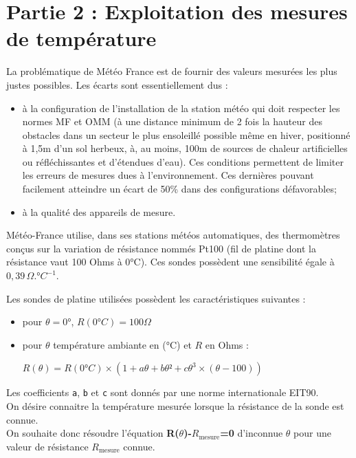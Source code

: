 \documentclass[10pt,fleqn]{article} %
\begin{document}
\section*{Partie 2 : Exploitation des mesures de température}
La problématique de Météo France est de fournir des valeurs mesurées les plus justes possibles. Les écarts sont essentiellement dus :
\begin{itemize}
	\item à la configuration de l'installation de la station météo qui doit respecter les normes MF et OMM (à une distance minimum de 2 fois la hauteur des obstacles dans un secteur le plus ensoleillé possible même en hiver, positionné à 1,5m d'un sol herbeux, à, au moins, 100m de sources de chaleur artificielles ou réfléchissantes et d'étendues d'eau). Ces conditions permettent de limiter les erreurs de mesures dues à l'environnement. Ces dernières pouvant facilement atteindre un écart de 50\% dans des configurations défavorables;
	\item à la qualité des appareils de mesure.
\end{itemize}

\vspace{0.5cm}
Météo-France utilise, dans ses stations météos automatiques, des thermomètres conçus sur la variation de résistance nommés Pt100 (fil de platine dont la résistance vaut 100 Ohms à 0°C). Ces sondes possèdent une sensibilité égale à $0,39\, \Omega.°C^{-1}$.

\vspace{0.5cm}
Les sondes de platine utilisées possèdent les caractéristiques suivantes :
\begin{itemize}
	\item pour $\theta=0°$, $R(0°C)=100\Omega$
	\item pour $\theta$ température ambiante en (°C) et $R$ en Ohms :
	
	\begin{center}
	$R(\theta)=R(0°C)\times(1+a\theta+b{\theta}²+c{\theta}^3\times(\theta-100))$
	\end{center}
	
\end{itemize}
Les coefficients \texttt{a}, \texttt{b} et \texttt{c} sont donnés par une norme internationale EIT90.\\

On désire connaitre la température mesurée lorsque la résistance de la sonde est connue.\\
On souhaite donc résoudre l'équation \textbf{R($\theta$)-$R_{\text{mesure}}$=0} d'inconnue $\theta$ pour une valeur de résistance $R_{\text{mesure}}$ connue.
\end{document}
